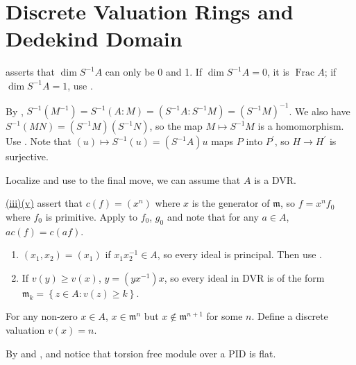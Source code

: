 \section{Discrete Valuation Rings and Dedekind Domain}

\begin{exercise}\label{ex9.1}
	 asserts that $\dim S^{-1}A$ can only be 0 and 1. If $\dim S^{-1}A=0$, it is $\operatorname{Frac}A$; if $\dim S^{-1}A=1$, use .
	
	By , $S^{-1}\left(M^{-1}\right)=S^{-1}(A:M)=\left(S^{-1}A:S^{-1}M\right)=\left(S^{-1}M\right)^{-1}$. We also have $S^{-1}(MN)=\left(S^{-1}M\right)\left(S^{-1}N\right)$, so the map $M\mapsto S^{-1}M$ is a homomorphism. Use . Note that $(u)\mapsto S^{-1}(u)=\left(S^{-1}A\right)u$ maps $P$ into $P^\prime$, so $H\rightarrow H^\prime$ is surjective.
\end{exercise}

\begin{exercise}\label{ex9.2}
	Localize and use  to the final move, we can assume that $A$ is a DVR.
	
	\hyperref[9.2]{(iii)(v)} assert that $c(f)=\left(x^n\right)$ where $x$ is the generator of $\mathfrak{m}$, so $f=x^nf_0$ where $f_0$ is primitive. Apply  to $f_0$, $g_0$ and note that for any $a\in A$, $ac(f)=c(af)$.
\end{exercise}

\begin{exercise}\label{ex9.3}
	\begin{enumerate}
		\item[$\Rightarrow$:] $\left(x_1,x_2\right)=\left(x_1\right)$ if $x_1x_2^{-1}\in A$, so every ideal is principal. Then use .
		\item[$\Leftarrow$:] If $v(y)\geqslant v(x)$, $y=\left(yx^{-1}\right)x$, so every ideal in DVR is of the form $\mathfrak{m}_k=\left\{z\in A:v(z)\geqslant k\right\}$.
	\end{enumerate}
\end{exercise}

\begin{exercise}\label{ex9.4}
	For any non-zero $x\in A$, $x\in\mathfrak{m}^n$ but $x\notin\mathfrak{m}^{n+1}$ for some $n$. Define a discrete valuation $v(x)=n$.
\end{exercise}

\begin{exercise}\label{ex9.5}
	By  and , and notice that torsion free module over a PID is flat.
\end{exercise}


